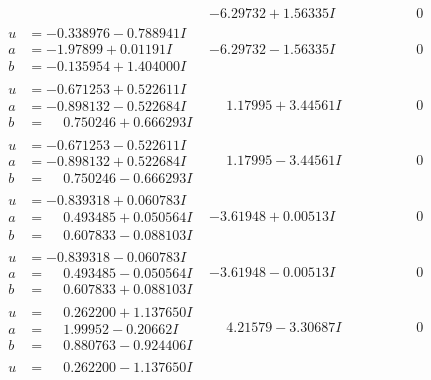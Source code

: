 \documentclass[1p]{elsarticle_modified}
\theoremstyle{definition}
\begin{document}
$$\begin{array}{c|c|c}
 & -6.29732 + 1.56335 I & \phantom{-0.000000 } 0 \\ \hline\begin{aligned}
u &= -0.338976 - 0.788941 I \\
a &= -1.97899 + 0.01191 I \\
b &= -0.135954 + 1.404000 I\end{aligned}
 & -6.29732 - 1.56335 I & \phantom{-0.000000 } 0 \\ \hline\begin{aligned}
u &= -0.671253 + 0.522611 I \\
a &= -0.898132 - 0.522684 I \\
b &= \phantom{-}0.750246 + 0.666293 I\end{aligned}
 & \phantom{-}1.17995 + 3.44561 I & \phantom{-0.000000 } 0 \\ \hline\begin{aligned}
u &= -0.671253 - 0.522611 I \\
a &= -0.898132 + 0.522684 I \\
b &= \phantom{-}0.750246 - 0.666293 I\end{aligned}
 & \phantom{-}1.17995 - 3.44561 I & \phantom{-0.000000 } 0 \\ \hline\begin{aligned}
u &= -0.839318 + 0.060783 I \\
a &= \phantom{-}0.493485 + 0.050564 I \\
b &= \phantom{-}0.607833 - 0.088103 I\end{aligned}
 & -3.61948 + 0.00513 I & \phantom{-0.000000 } 0 \\ \hline\begin{aligned}
u &= -0.839318 - 0.060783 I \\
a &= \phantom{-}0.493485 - 0.050564 I \\
b &= \phantom{-}0.607833 + 0.088103 I\end{aligned}
 & -3.61948 - 0.00513 I & \phantom{-0.000000 } 0 \\ \hline\begin{aligned}
u &= \phantom{-}0.262200 + 1.137650 I \\
a &= \phantom{-}1.99952 - 0.20662 I \\
b &= \phantom{-}0.880763 - 0.924406 I\end{aligned}
 & \phantom{-}4.21579 - 3.30687 I & \phantom{-0.000000 } 0 \\ \hline\begin{aligned}
u &= \phantom{-}0.262200 - 1.137650 I \\

\end{aligned}
\end{array}$$
\end{document}
